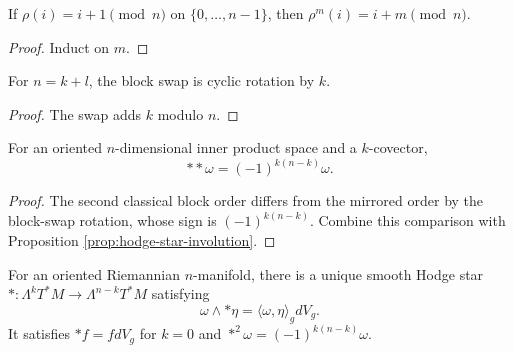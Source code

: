 \begin{lemma}
\label{lem:finrotate-pow-val}




If $\rho(i)=i+1\pmod n$ on $\{0,\ldots,n-1\}$, then $\rho^m(i)=i+m\pmod n$.
\end{lemma}
\begin{proof}

\sketch Induct on $m$.
\end{proof}

\begin{lemma}
\label{lem:blockswap-eq-rotate}





For $n=k+l$, the block swap is cyclic rotation by $k$.
\end{lemma}
\begin{proof}

\sketch The swap adds $k$ modulo $n$.
\end{proof}

\begin{proposition}
\label{prop:hodge-star-classical-involution}





For an oriented $n$-dimensional inner product space and a $k$-covector,
\[
{*}{*}\omega=(-1)^{k(n-k)}\omega.
\]
\end{proposition}
\begin{proof}

\sketch The second classical block order differs from the mirrored order by the block-swap rotation, whose sign is $(-1)^{k(n-k)}$. Combine this comparison with Proposition \ref{prop:hodge-star-involution}.
\end{proof}

\begin{proposition}\label{prop:hodge-star-operator}


For an oriented Riemannian $n$-manifold, there is a unique smooth Hodge star
$*:\Lambda^kT^*M\to\Lambda^{n-k}T^*M$ satisfying
\[
\omega\wedge {*}\eta=\langle\omega,\eta\rangle_gdV_g.
\]
It satisfies $*f=fdV_g$ for $k=0$ and
$*^2\omega=(-1)^{k(n-k)}\omega$.
\end{proposition}

